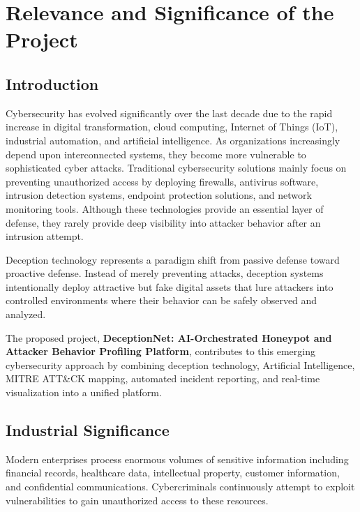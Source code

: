 \documentclass[12pt,a4paper]{report}
\begin{document}
\clearpage


\chapter{Relevance and Significance of the Project}

\section{Introduction}

Cybersecurity has evolved significantly over the last decade due to the rapid increase in digital transformation, cloud computing, Internet of Things (IoT), industrial automation, and artificial intelligence. As organizations increasingly depend upon interconnected systems, they become more vulnerable to sophisticated cyber attacks. Traditional cybersecurity solutions mainly focus on preventing unauthorized access by deploying firewalls, antivirus software, intrusion detection systems, endpoint protection solutions, and network monitoring tools. Although these technologies provide an essential layer of defense, they rarely provide deep visibility into attacker behavior after an intrusion attempt.

Deception technology represents a paradigm shift from passive defense toward proactive defense. Instead of merely preventing attacks, deception systems intentionally deploy attractive but fake digital assets that lure attackers into controlled environments where their behavior can be safely observed and analyzed.

The proposed project, \textbf{DeceptionNet: AI-Orchestrated Honeypot and Attacker Behavior Profiling Platform}, contributes to this emerging cybersecurity approach by combining deception technology, Artificial Intelligence, MITRE ATT\&CK mapping, automated incident reporting, and real-time visualization into a unified platform.


\section{Industrial Significance}

Modern enterprises process enormous volumes of sensitive information including financial records, healthcare data, intellectual property, customer information, and confidential communications. Cybercriminals continuously attempt to exploit vulnerabilities to gain unauthorized access to these resources.
\end{document}
